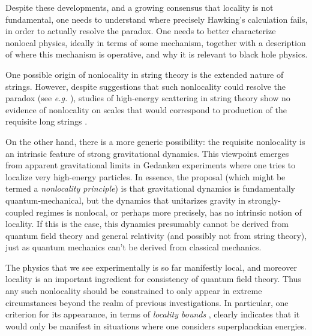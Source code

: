 Despite these developments, and a growing consensus that locality is not fundamental, one needs  to understand   where precisely Hawking's calculation fails, in order to actually resolve the paradox.  One needs to better characterize nonlocal physics, ideally in terms of some mechanism, together with a description of where this mechanism is operative, and why it is relevant to black hole physics.

One possible origin of nonlocality in string theory is the extended nature of strings.  However, despite suggestions that such nonlocality could resolve the paradox (see {\it e.g.} \LPSTU), studies of high-energy scattering in string theory show no evidence of nonlocality on scales that would correspond to production of the requisite long strings \SGloc.

On the other hand, there is a more generic possibility:  the requisite nonlocality is an intrinsic feature of strong gravitational dynamics.  This viewpoint  emerges from apparent gravitational limits in Gedanken experiments where one tries to localize very high-energy particles.  In essence, the  proposal (which might be termed a {\it nonlocality principle}) is that gravitational dynamics is fundamentally quantum-mechanical, but the dynamics that unitarizes gravity in strongly-coupled regimes is nonlocal, or perhaps more precisely, has no intrinsic notion of locality.  If this is the case, this dynamics presumably cannot be derived from quantum field theory and general relativity (and possibly not from string theory), just as quantum mechanics can't be derived from classical mechanics.

The physics that we see experimentally is so far manifestly local, and moreover locality is an important ingredient for consistency of quantum field theory.  Thus any such nonlocality should be constrained to only appear in extreme circumstances beyond the realm of previous investigations.  In particular, one criterion for its appearance, in terms of {\it locality bounds} , clearly indicates that it would only be manifest in situations where one considers superplanckian energies.

